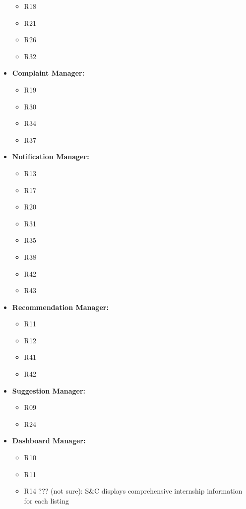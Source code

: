 \begin{itemize}
\begin{itemize}
            \item R18
            \item R21
            \item R26
            \item R32
        \end{itemize}
    \item \textbf{Complaint Manager:}
        \begin{itemize}
            \item R19
            \item R30
            \item R34
            \item R37
        \end{itemize}
    \item \textbf{Notification Manager:}
        \begin{itemize}
            \item R13
            \item R17
            \item R20
            \item R31
            \item R35
            \item R38
            \item R42
            \item R43
        \end{itemize}
    \item \textbf{Recommendation Manager:}
        \begin{itemize}
            \item R11
            \item R12
            \item R41
            \item R42
        \end{itemize}
    \item \textbf{Suggestion Manager:}
        \begin{itemize}
            \item R09
            \item R24
        \end{itemize}
    \item \textbf{Dashboard Manager:}
        \begin{itemize}
            \item R10
            \item R11
            \item R14 ??? (not sure): S\&C displays comprehensive internship information for each listing

\end{itemize}
\end{itemize}
